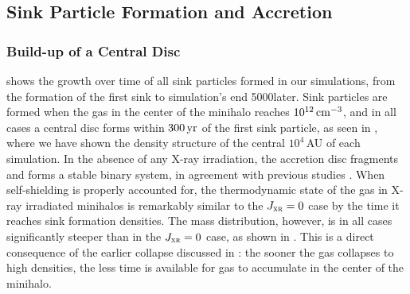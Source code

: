 \documentclass[../thesis.tex]{subfiles}
\begin{document}
\subsection{Sink Particle Formation and Accretion}
\subsubsection{Build-up of a Central Disc}
  shows the growth over time of all sink particles formed in our simulations, from the formation of the first sink to simulation's end 5000\yr later.  Sink particles are formed when the gas in the center of the minihalo reaches $10^{12}\,\mathrm{cm}^{-3}$, and in all cases a central disc forms within $300\,\mathrm{yr}$ of the first sink particle, as seen in , where we have shown the density structure of the central $10^4\,$AU of each simulation.  In the absence of any X-ray irradiation, the accretion disc fragments and forms a stable binary system, in agreement with previous studies \citep[e.g.,][]{ StacyGreifBromm2010, Clarketal2011a, Clarketal2011b, Greifetal2011, Greifetal2012}. When self-shielding is properly accounted for, the thermodynamic state of the gas in X-ray irradiated minihalos is remarkably similar to the $J_{\textsc{xr}}=0$ case by the time it reaches sink formation densities. The mass distribution, however, is in all cases significantly steeper than in the $J_{\textsc{xr}}=0$ case, as shown in . This is a direct consequence of the earlier collapse discussed in : the sooner the gas collapses to high densities, the less time is available for gas to accumulate in the center of the minihalo. 
\end{document}
